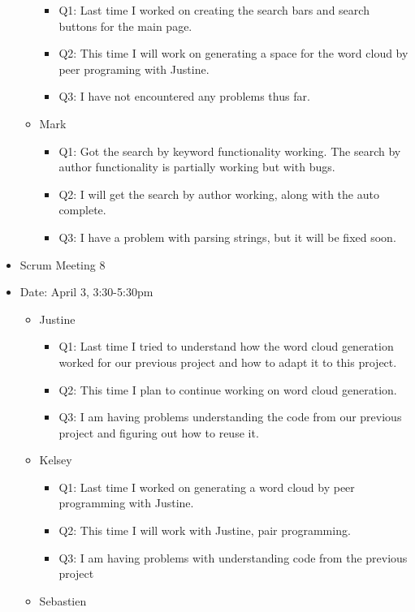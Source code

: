 \documentclass[]{article}
\begin{document}
\begin{itemize}
\begin{itemize}
    \begin{itemize}
    \itemsep1pt\parskip0pt
    \item
      Q1: Last time I worked on creating the search bars and search
      buttons for the main page.
    \item
      Q2: This time I will work on generating a space for the word cloud
      by peer programing with Justine.
    \item
      Q3: I have not encountered any problems thus far.
    \end{itemize}
  \item
    Mark

    \begin{itemize}
    \itemsep1pt\parskip0pt
    \item
      Q1: Got the search by keyword functionality working. The search by
      author functionality is partially working but with bugs.
    \item
      Q2: I will get the search by author working, along with the auto
      complete.
    \item
      Q3: I have a problem with parsing strings, but it will be fixed
      soon.
    \end{itemize}
  \end{itemize}
\item
  Scrum Meeting 8
\item
  Date: April 3, 3:30-5:30pm

  \begin{itemize}
  \itemsep1pt\parskip0pt
  \item
    Justine

    \begin{itemize}
    \itemsep1pt\parskip0pt
    \item
      Q1: Last time I tried to understand how the word cloud generation
      worked for our previous project and how to adapt it to this
      project.
    \item
      Q2: This time I plan to continue working on word cloud generation.
    \item
      Q3: I am having problems understanding the code from our previous
      project and figuring out how to reuse it.
    \end{itemize}
  \item
    Kelsey

    \begin{itemize}
    \itemsep1pt\parskip0pt
    \item
      Q1: Last time I worked on generating a word cloud by peer
      programming with Justine.
    \item
      Q2: This time I will work with Justine, pair programming.
    \item
      Q3: I am having problems with understanding code from the previous
      project
    \end{itemize}
  \item
    Sebastien


\end{itemize}
\end{itemize}
\end{document}
